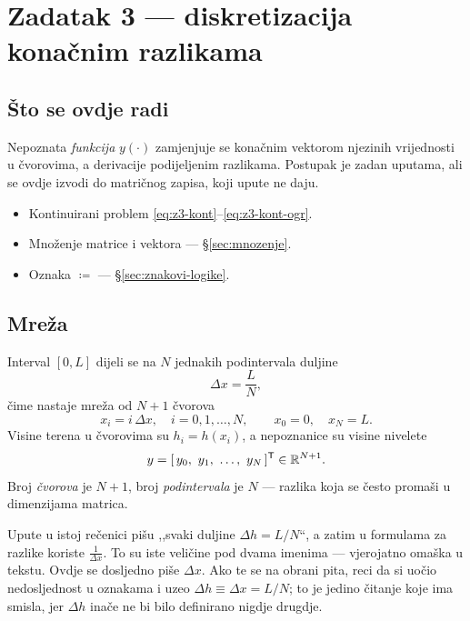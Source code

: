 \chapter{Zadatak 3 --- diskretizacija konačnim razlikama}
\label{ch:z3-diskretizacija}

\section{Što se ovdje radi}

Nepoznata \emph{funkcija} $y(\cdot)$ zamjenjuje se konačnim vektorom njezinih
vrijednosti u čvorovima, a derivacije podijeljenim razlikama. Postupak je zadan
uputama, ali se ovdje izvodi do matričnog zapisa, koji upute ne daju.

\begin{predznanje}
\begin{itemize}[nosep,leftmargin=*]
  \item Kontinuirani problem \eqref{eq:z3-kont}--\eqref{eq:z3-kont-ogr}.
  \item Množenje matrice i vektora --- \S\ref{sec:mnozenje}.
  \item Oznaka $\coloneqq$ --- \S\ref{sec:znakovi-logike}.
\end{itemize}
\end{predznanje}

\section{Mreža}
\label{sec:z3-mreza}

\begin{korak}
Interval $[0, L]$ dijeli se na $N$ jednakih podintervala duljine
\begin{equation}
\Delta x = \frac{L}{N},
\end{equation}
čime nastaje mreža od $N+1$ čvorova
\begin{equation}
x_i = i\,\Delta x, \quad i = 0, 1, \dots, N,
\qquad x_0 = 0, \quad x_N = L .
\end{equation}
Visine terena u čvorovima su $h_i = h(x_i)$, a nepoznanice su visine nivelete
\begin{equation}
y = [\,y_0,\ y_1,\ \dots,\ y_N\,]^{\mathsf{T}} \in \mathbb{R}^{N+1} .
\end{equation}
Broj \emph{čvorova} je $N+1$, broj \emph{podintervala} je $N$ --- razlika koja se
često promaši u dimenzijama matrica.
\end{korak}

\begin{zamka}
Upute u istoj rečenici pišu ,,svaki duljine $\Delta h = L/N$``, a zatim u
formulama za razlike koriste $\frac{1}{\Delta x}$. To su iste veličine pod dvama
imenima --- vjerojatno omaška u tekstu. Ovdje se dosljedno piše $\Delta x$. Ako
te se na obrani pita, reci da si uočio nedosljednost u oznakama i uzeo
$\Delta h \equiv \Delta x = L/N$; to je jedino čitanje koje ima smisla, jer
$\Delta h$ inače ne bi bilo definirano nigdje drugdje.
\end{zamka}


